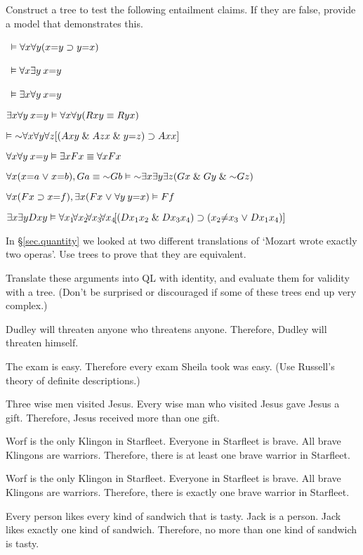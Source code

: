 \solutions
\problempart Construct a tree to test the following entailment claims. If they are false, provide a model that demonstrates this.
\label{pr.IdentityTrees}
\begin{earg}
\item\  $\vDash \forall x \forall y (x{=}y \supset y{=}x)$
\item\ $\vDash \forall x \exists y \: x{=}y$
\item\  $\vDash \exists x \forall y \: x{=}y$
\item   $\exists x \forall y \: x{=}y \vDash \forall x \forall y (Rxy \equiv Ryx)$
\item   $\models \enot \qt{\forall}{x} \qt{\forall}{y} \qt{\forall}{z} [(Axy \eand Azx \eand y{=}z) \eif Axx] $
\item  $\forall x \forall y \: x{=}y \vDash \exists x Fx \equiv \forall x Fx$
\item $\qt{\forall}{x} (x{=}a \eor x{=}b), Ga \eiff \enot Gb \models \enot \qt{\exists}{x} \qt{\exists}{y} \qt{\exists}{z} (Gx \eand Gy \eand \enot Gz)$
\item $\forall x (Fx \supset x{=}f), \exists x (Fx \mkern1mu\vee\mkern1mu \forall y \: y{=}x) \vDash Ff$
\item $\exists x \exists y Dxy \vDash \forall x_{1} \! \forall x_{2}\! \forall x_{3}\! \forall x_{4}\! [(Dx_{1}x_{2} \mathrel\& Dx_{3}x_{4}) \supset (x_{2}{\neq}x_{3} \mkern1mu\vee\mkern1mu Dx_{1}x_{4})]$
\end{earg}

\problempart In \S \ref{sec.quantity} we looked at two different translations of `Mozart wrote exactly two operas'. Use trees to prove that they are equivalent.

\problempart Translate these arguments into QL with identity, and evaluate them for validity with a tree. (Don't be surprised or discouraged if some of these trees end up very complex.)
\label{pr.IdentityArguments}
\begin{earg}
\item Dudley will threaten anyone who threatens anyone. Therefore, Dudley will threaten himself.
\item The exam is easy. Therefore every exam Sheila took was easy. (Use Russell's theory of definite descriptions.)
\item Three wise men visited Jesus. Every wise man who visited Jesus gave Jesus a gift. Therefore, Jesus received more than one gift.
\item Worf is the only Klingon in Starfleet. Everyone in Starfleet is brave. All brave Klingons are warriors. Therefore, there is at least one brave warrior in Starfleet.
\item Worf is the only Klingon in Starfleet. Everyone in Starfleet is brave. All brave Klingons are warriors. Therefore, there is exactly one brave warrior in Starfleet.
\item Every person likes every kind of sandwich that is tasty. Jack is a person. Jack likes exactly one kind of sandwich. Therefore, no more than one kind of sandwich is tasty.
\end{earg}


\fi 
